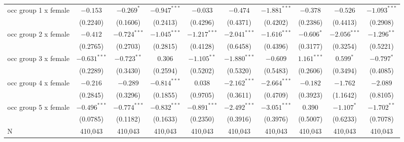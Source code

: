 \begin{tabular}{l|ccc|ccc|ccc|}
occ group 1 x female &        $-0.153$ &      $-0.269^*$ &  $-0.947^{***}$ &        $-0.033$ &        $-0.474$ &  $-1.881^{***}$ &        $-0.378$ &        $-0.526$ &  $-1.093^{***}$ \\
                     &        (0.2240) &        (0.1606) &        (0.2413) &        (0.4296) &        (0.4371) &        (0.4202) &        (0.2386) &        (0.4413) &        (0.2908) \\
occ group 2 x female &        $-0.412$ &  $-0.724^{***}$ &  $-1.045^{***}$ &  $-1.217^{***}$ &  $-2.041^{***}$ &  $-1.616^{***}$ &      $-0.606^*$ &  $-2.056^{***}$ &   $-1.296^{**}$ \\
                     &        (0.2765) &        (0.2703) &        (0.2815) &        (0.4128) &        (0.6458) &        (0.4396) &        (0.3177) &        (0.3254) &        (0.5221) \\
occ group 3 x female &  $-0.631^{***}$ &   $-0.723^{**}$ &         $0.306$ &   $-1.105^{**}$ &  $-1.880^{***}$ &        $-0.609$ &   $1.161^{***}$ &       $0.599^*$ &      $-0.797^*$ \\
                     &        (0.2289) &        (0.3430) &        (0.2594) &        (0.5202) &        (0.5320) &        (0.5483) &        (0.2606) &        (0.3494) &        (0.4085) \\
occ group 4 x female &        $-0.216$ &        $-0.289$ &  $-0.814^{***}$ &         $0.038$ &  $-2.162^{***}$ &  $-2.664^{***}$ &        $-0.182$ &        $-1.762$ &        $-2.089$ \\
                     &        (0.2845) &        (0.3296) &        (0.1855) &        (0.9705) &        (0.3611) &        (0.4709) &        (0.3923) &        (1.1642) &        (0.8105) \\
occ group 5 x female &  $-0.496^{***}$ &  $-0.774^{***}$ &  $-0.832^{***}$ &  $-0.891^{***}$ &  $-2.492^{***}$ &  $-3.051^{***}$ &         $0.390$ &      $-1.107^*$ &   $-1.702^{**}$ \\
                     &        (0.0785) &        (0.1182) &        (0.1633) &        (0.2350) &        (0.3916) &        (0.3976) &        (0.5007) &        (0.6233) &        (0.7078) \\
N                    &         410,043 &         410,043 &         410,043 &         410,043 &         410,043 &         410,043 &         410,043 &         410,043 &         410,043 \\
\bottomrule
\end{tabular}
